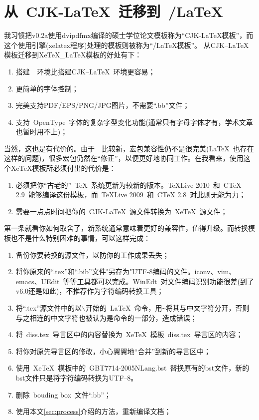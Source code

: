 \section{从~CJK-\LaTeX~迁移到~\XeTeX/\LaTeX}
\label{sec:whydvipdfm}

我习惯把v0.2a使用dvipdfmx编译的硕士学位论文模板称为``CJK-\LaTeX{}模板''，而这个使用\XeTeX{}引擎(xelatex程序)处理的模板则被称为``\XeTeX/\LaTeX{}模板''。
从CJK--LaTeX模板迁移到XeTeX\_LaTeX模板的好处有下：
\begin{enumerate}
\item[\large\smiley] 搭建~\XeTeX~环境比搭建CJK--\LaTeX~环境更容易；
\item[\large\smiley] 更简单的字体控制；
\item[\large\smiley] 完美支持PDF/EPS/PNG/JPG图片，不需要``.bb''文件；
\item[\large\smiley] 支持~OpenType~字体的复杂字型变化功能(通常只有字母字体才有，学术文章也暂时用不上)；
\end{enumerate}

当然，这也是有代价的。由于~\XeTeX~比较新，宏包兼容性仍不是很完美(\LaTeX~也存在这样的问题)，很多宏包仍然在“修正”，以便更好地协同工作。在我看来，使用这个XeTeX模板所必须付出的代价是：

\begin{enumerate}
\item[\large\frownie] 必须把你“古老的”~\TeX~系统更新为较新的版本。TeXLive 2010~和~CTeX 2.9~能够编译这份模板，而~TeXLive 2009~和~CTeX 2.8~对此则无能为力；
\item[\large\frownie] 需要一点点时间把你的~CJK-LaTeX~源文件转换为~XeTeX~源文件；
\end{enumerate}

第一条就看你如何取舍了，新系统通常意味着更好的兼容性，值得升级。而转换模板也不是什么特别困难的事情，可以这样完成：

\begin{enumerate}
\item 备份你要转换的源文件，以防你的工作成果丢失；
\item 将你原来的``.tex''和``.bib''文件"另存为"UTF-8编码的文件。iconv、vim、emacs、UEdit~等等工具都可以完成。WinEdt~对文件编码识别功能很差(到了v6.0还是如此)，不推荐作为字符编码转换工具；
\item 将``.tex''源文件中的以$\backslash$开始的~\LaTeX~命令，用\verb|~|将其与中文字符分开，否则与之相连的中文字符也被认为是命令的一部分，造成错误；
\item 将~diss.tex~导言区中的内容替换为~XeTeX~模板~diss.tex~导言区的内容；
\item 将你对原先导言区的修改，小心翼翼地``合并''到新的导言区中；
\item 使用~XeTeX~模板中的~GBT7714-2005NLang.bst~替换原有的bst文件，新的bst文件只是将字符编码转换为UTF--8。
\item 删除~bouding box~文件``.bb''；
\item 使用本文\ref{sec:process}介绍的方法，重新编译文档；
\end{enumerate}

